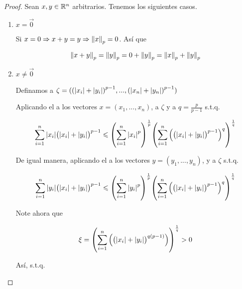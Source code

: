 \begin{proof}
    Sean $x,y \in \mathbb{R}^n$ arbitrarios. Tenemos los siguientes casos.
    \begin{enumerate}
        \item $x= \vec{0}$

        Si $x=0 \Rightarrow x+y = y \Rightarrow {\norm{x}}_{p}  = 0$. Así que

        \begin{equation*}
            {\norm{x+y}}_{p} = {\norm{y}}_{p} = 0 + {\norm{y}}_{p} = {\norm{x}}_{p} + {\norm{y}}_{p}
        \end{equation*}

        \item $x \neq \vec{0}$

        Definamos a $\zeta = ({(\abs{{x}_{i}}+\abs{{y}_{i}})}^{p-1},...,{(\abs{{x}_{n}}+\abs{{y}_{n}})}^{p-1})$

        Aplicando el  a los vectores $ x = (x_1,...,x_n)$, a $\zeta$ y a $q=\frac{p}{p-1}$ s.t.q.

        \begin{equation*}
            \sum\limits_{i=1}^{n} \abs{{x}_{i}} {\left( \abs{{x}_{i}}+\abs{{y}_{i}} \right)}^{p-1} \leqslant {\left( \sum\limits_{i=1}^{n} {\abs{{x}_{i}}}^{p}\right)}^{\frac{1}{p}} {\left( \sum\limits_{i=1}^{n} {\left( {\left( \abs{{x}_{i}}+\abs{{y}_{i}} \right)}^{p-1}\right)}^{q} \right)}^{\frac{1}{q}}
        \end{equation*}

        De igual manera, aplicando el  a los vectores $ y = (y_1,...,y_n)$, y a $\zeta$ s.t.q.

        \begin{equation*}
            \sum\limits_{i=1}^{n} \abs{{y}_{i}} {\left( \abs{{x}_{i}}+\abs{{y}_{i}} \right)}^{p-1} \leqslant {\left( \sum\limits_{i=1}^{n} {\abs{{y}_{i}}}^{p}\right)}^{\frac{1}{p}} {\left( \sum\limits_{i=1}^{n} {\left( {\left( \abs{{x}_{i}}+\abs{{y}_{i}} \right)}^{p-1}\right)}^{q} \right)}^{\frac{1}{q}}
        \end{equation*}

        Note ahora que 

        \begin{equation*}
            \xi = {\left( \sum\limits_{i=1}^{n} \left( {\left( \abs{{x}_{i}}+\abs{{y}_{i}} \right)}^{q ({p-1})}\right)\right)}^{\frac{1}{q}} > 0 
        \end{equation*}

        Así, s.t.q.


\end{enumerate}
\end{proof}
